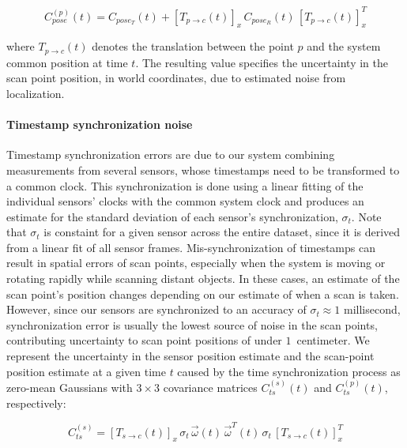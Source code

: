 \documentclass[12pt,onecolumn,oneside]{book}
\begin{document}
\begin{equation}
C^{(p)}_{pose}(t) = C_{pose_T}(t) + \left[ T_{p\rightarrow c}(t) \right]_x \, C_{pose_R}(t) \, \left[ T_{p\rightarrow c}(t) \right]_x^T
\end{equation}

where $T_{p\rightarrow c}(t)$ denotes the translation between the point $p$ and the system common position at time $t$.  The resulting value specifies the uncertainty in the scan point position, in world coordinates, due to estimated noise from localization.

\paragraph*{Timestamp synchronization noise}
Timestamp synchronization errors are due to our system combining measurements from several sensors, whose timestamps need to be transformed to a common clock.  This synchronization is done using a linear fitting of the individual sensors' clocks with the common system clock and produces an estimate for the standard deviation of each sensor's synchronization, $\sigma_t$.  Note that $\sigma_t$ is constaint for a given sensor across the entire dataset, since it is derived from a linear fit of all sensor frames.  Mis-synchronization of timestamps can result in spatial errors of scan points, especially when the system is moving or rotating rapidly while scanning distant objects.  In these cases, an estimate of the scan point's position changes depending on our estimate of when a scan is taken.  However, since our sensors are synchronized to an accuracy of $\sigma_t \approx 1$ millisecond, synchronization error is usually the lowest source of noise in the scan points, contributing uncertainty to scan point positions of under $1$~centimeter.  We represent the uncertainty in the sensor position estimate and the scan-point position estimate at a given time $t$ caused by the time synchronization process as zero-mean Gaussians with $3 \times 3$ covariance matrices $C^{(s)}_{ts}(t)$ and $C^{(p)}_{ts}(t)$, respectively:

\begin{equation}
C^{(s)}_{ts} = \left[ T_{s\rightarrow c}(t) \right]_x \, \sigma_{t} \, \vec{\omega}(t) \, \vec{\omega}^T(t) \, \sigma_{t} \, \left[ T_{s\rightarrow c}(t) \right]_x^T
\end{equation}
\end{document}
